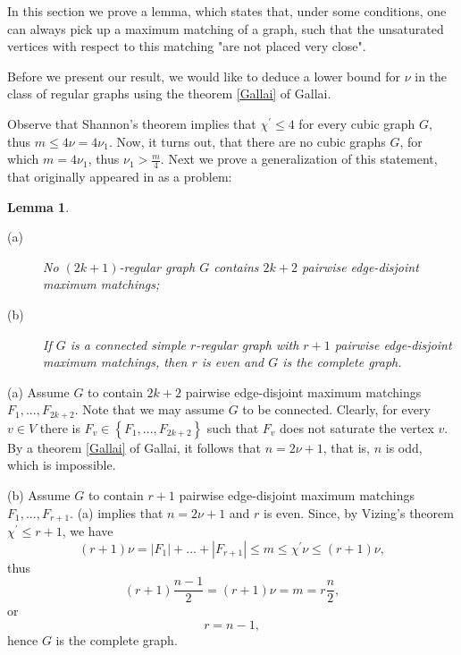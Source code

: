 \documentclass[fleqn,12pt,twoside]{article}
\newtheorem{lemma}{Lemma}
\newenvironment{proof}[1][Proof.]{\begin{trivlist}
\item[\hskip \labelsep {\bfseries #1}]}{\end{trivlist}}
\begin{document}
In this section we prove a lemma, which states that, under some
conditions, one can always pick up a maximum matching of a graph,
such that the unsaturated vertices with respect to this matching
"are not placed very close".

Before we present our result, we would like to deduce a lower bound
for $\nu $ in the class of regular graphs using the theorem
\ref{Gallai} of Gallai.

Observe that Shannon's theorem implies that $\chi ^{\prime }\leq 4$ for every cubic graph $G$, thus $m \leq 4\nu =4\nu _{1}$. Now, it turns out, that there are no cubic
graphs $G$, for which $m =4\nu _{1}$, thus $\nu _{1}>\frac{m}{4}$.
Next we
prove a generalization of this statement, that originally appeared in \cite {Monthly} as a problem:

\begin{lemma}
\label{OddRegulars}

\begin{description}
\item[(a)] No $(2k+1)$-regular graph $G$ contains $2k+2$ pairwise
edge-disjoint maximum matchings;

\item[(b)] If $G$ is a connected simple $r$-regular graph with $r+1$
pairwise edge-disjoint maximum matchings, then $r$ is even and $G$
is the complete graph.
\end{description}
\end{lemma}

\begin{proof}
(a) Assume $G$ to contain $2k+2$ pairwise edge-disjoint maximum matchings $F_{1},...,F_{2k+2}$. Note that we may assume $G$ to be connected.
Clearly, for every $v\in V$ there is $F_{v}\in \left\{
F_{1},...,F_{2k+2}\right\} $ such that $F_{v}$ does not saturate the
vertex $v$. By a theorem \ref{Gallai} of Gallai, it follows that $n
=2\nu+1$, that is, $n$ is odd, which is impossible.

(b) Assume $G$ to contain $r+1$ pairwise edge-disjoint maximum matchings $F_{1},...,F_{r+1}$. (a) implies that $n =2\nu+1$ and $r$ is even. Since, by Vizing's theorem $\chi ^{\prime }\leq r+1$, we have\begin{equation*}
(r+1)\nu =\left\vert F_{1}\right\vert +...+\left\vert
F_{r+1}\right\vert \leq m \leq \chi ^{\prime }\nu \leq (r+1)\nu,
\end{equation*}
thus
\begin{equation*}
(r+1)\frac{n-1}{2}=(r+1)\nu =m =r\frac{n}{2},
\end{equation*}
or
\begin{equation*}
r=n -1,
\end{equation*}
hence $G$ is the complete graph.
\end{proof}
\end{document}
